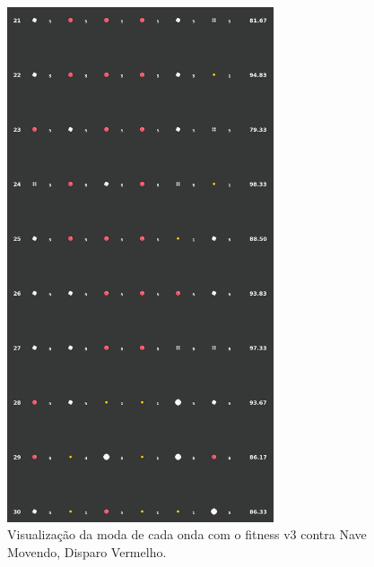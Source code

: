 \begin{figure}[H]
  \centering
  \includegraphics[width=0.7\textwidth]{figuras/ss/ss_redmove_ai_mode_2_3.png}
  \caption{Visualização da moda de cada onda com o fitness v3 contra Nave Movendo, Disparo Vermelho.}
  \label{fig:ss-moda-rm-2-3}
\end{figure}